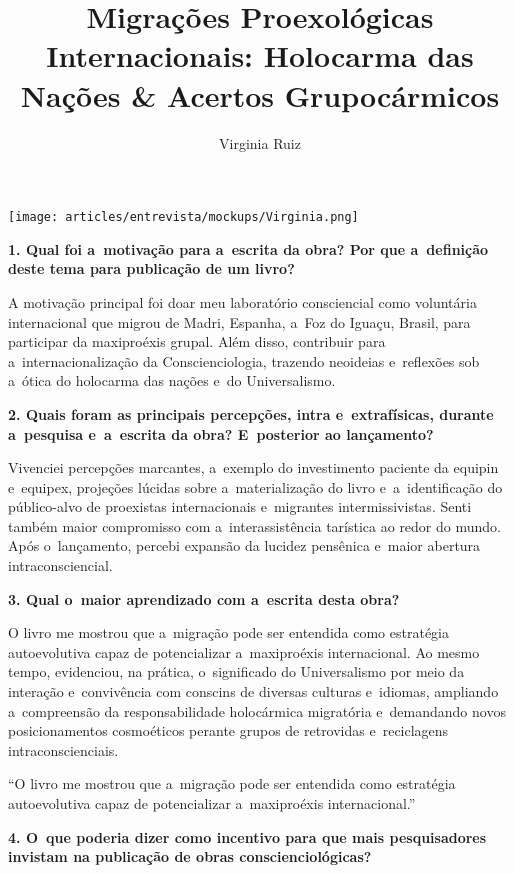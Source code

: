 \documentclass{gescons}
\author{Virginia Ruiz}
\title{Migrações Proexológicas Internacionais: Holocarma das Nações \& Acertos Grupocármicos}
\begin{document}
    \makeentrevistatitle

    \begin{multicols}{2}


\begin{center}
    \texttt{[image: articles/entrevista/mockups/Virginia.png]}
\end{center}


\textbf{1.       Qual foi a~motivação para a~escrita da obra? Por que a~definição deste tema para publicação de um livro?}

A motivação principal foi doar meu laboratório consciencial como voluntária internacional que migrou de Madri, Espanha, a~Foz do Iguaçu, Brasil, para participar da maxiproéxis grupal. Além disso, contribuir para a~internacionalização da Conscienciologia, trazendo neoideias e~reflexões sob a~ótica do holocarma das nações e~do Universalismo.


\textbf{2.       Quais foram as principais percepções, intra e~extrafísicas, durante a~pesquisa e~a~escrita da obra? E~posterior ao lançamento?}

Vivenciei percepções marcantes, a~exemplo do investimento paciente da equipin e~equipex, projeções lúcidas sobre a~materialização do livro e~a~identificação do público-alvo de proexistas internacionais e~migrantes intermissivistas. Senti também maior compromisso com a~interassistência tarística ao redor do mundo. Após o~lançamento, percebi expansão da lucidez pensênica e~maior abertura intraconsciencial.


\textbf{3.       Qual o~maior aprendizado com a~escrita desta obra?}

O livro me mostrou que a~migração pode ser entendida como estratégia autoevolutiva capaz de potencializar a~maxiproéxis internacional. Ao mesmo tempo, evidenciou, na prática, o~significado do Universalismo por meio da interação e~convivência com conscins de diversas culturas e~idiomas, ampliando a~compreensão da responsabilidade holocármica migratória e~demandando novos posicionamentos cosmoéticos perante grupos de retrovidas e~reciclagens intraconscienciais.

\begin{pullquote}
    ``O livro me mostrou que a~migração pode ser entendida como estratégia autoevolutiva capaz de potencializar a~maxiproéxis internacional.''
\end{pullquote}

\textbf{4.       O~que poderia dizer como incentivo para que mais pesquisadores invistam na publicação de obras conscienciológicas?}


\end{multicols}
\end{document}
